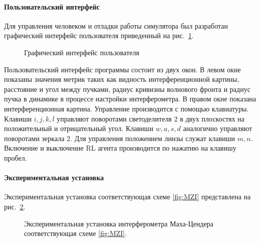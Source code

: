\paragraph{Пользовательский интерфейс}

Для управления человеком и отладки работы симулятора был разработан графический интерфейс пользователя приведенный на рис.~\ref{fig:gui}. 

\begin{figure}[ht]
\caption{Графический интерфейс пользователя}
\label{fig:gui}
\end{figure}

Пользовательский интерфейс программы состоит из двух окон. В левом окне показаны значения метрик таких как видность интерференционной картины, расстояние и угол между пучками, радиус кривизны волнового фронта и радиус пучка в динамике в процессе настройки интерферометра. В правом окне показана интерференционная картина. Управление производится с помощью клавиатуры. Клавиши $i,j,k,l$ управляют поворотами светоделителя 2 в двух плоскостях на положительный и отрицательный угол. Клавиши $w,a,s,d$ аналогично управляют поворотами зеркала 2. Для управления положением линзы служат клавиши $m,n$. Включение и выключение RL агента производится по нажатию на клавишу пробел.

\paragraph{Экспериментальная установка}

Экспериментальная установка соответствующая схеме \ref{fig:MZI} представлена на рис.~\ref{fig:MZI_exp}. 

\begin{figure}[ht]
\caption{Экспериментальная установка интерферометра Маха-Цендера соответствующая схеме \ref{fig:MZI}.}
\label{fig:MZI_exp}
\end{figure}


